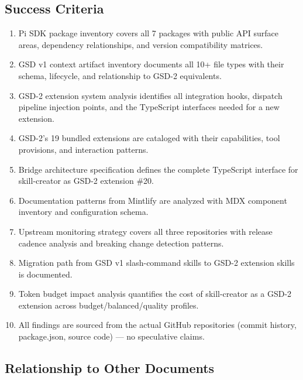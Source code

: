 \documentclass[11pt,letterpaper]{article}
\begin{document}
\subsection{Success Criteria}

\begin{enumerate}[leftmargin=2em]
\item Pi SDK package inventory covers all 7 packages with public API surface areas, dependency relationships, and version compatibility matrices.
\item GSD v1 context artifact inventory documents all 10+ file types with their schema, lifecycle, and relationship to GSD-2 equivalents.
\item GSD-2 extension system analysis identifies all integration hooks, dispatch pipeline injection points, and the TypeScript interfaces needed for a new extension.
\item GSD-2's 19 bundled extensions are cataloged with their capabilities, tool provisions, and interaction patterns.
\item Bridge architecture specification defines the complete TypeScript interface for skill-creator as GSD-2 extension \#20.
\item Documentation patterns from Mintlify are analyzed with MDX component inventory and configuration schema.
\item Upstream monitoring strategy covers all three repositories with release cadence analysis and breaking change detection patterns.
\item Migration path from GSD v1 slash-command skills to GSD-2 extension skills is documented.
\item Token budget impact analysis quantifies the cost of skill-creator as a GSD-2 extension across budget/balanced/quality profiles.
\item All findings are sourced from the actual GitHub repositories (commit history, package.json, source code) --- no speculative claims.
\end{enumerate}

\subsection{Relationship to Other Documents}
\end{document}
